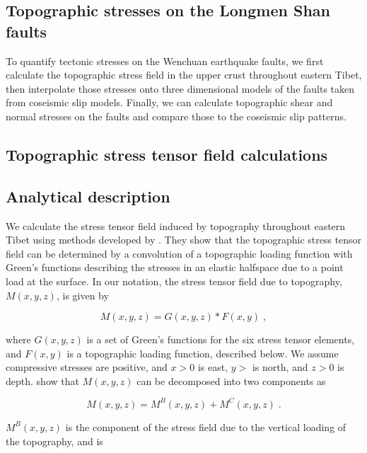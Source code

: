 \documentclass[twocolumn,jgrga]{AGUTeX}
\begin{document}
\begin{article}
\section{Topographic stresses on the Longmen Shan
faults}\label{topographic-stresses-on-the-longmen-shan-faults}

To quantify tectonic stresses on the Wenchuan earthquake faults, we
first calculate the topographic stress field in the upper crust
throughout eastern Tibet, then interpolate those stresses onto three
dimensional models of the faults taken from coseismic slip models.
Finally, we can calculate topographic shear and normal stresses on the
faults and compare those to the coseismic slip patterns.

\subsection{Topographic stress tensor field
calculations}\label{topographic-stress-tensor-field-calculations}

\subsection{Analytical description}\label{analytical-description}

We calculate the stress tensor field induced by topography throughout
eastern Tibet using methods developed by 
\citet{liuzoback1992}. They show that the topographic stress tensor
field can be determined by a convolution of a topographic loading
function with Green's functions describing the stresses in an elastic
halfspace due to a point load at the surface. In our notation, the
stress tensor field due to topography, $M(x,y,z)$, is given by

\begin{equation}
M(x, y, z) = G(x, y, z) * F(x, y) \; ,
\end{equation}

where $G(x,y,z)$ is a set of Green's functions for the six stress tensor
elements, and $F(x,y)$ is a topographic loading function, described
below. We assume compressive stresses are positive, and $x>0$ is east,
$y>$ is north, and $z>0$ is depth. \citet{liuzoback1992}
show that $M(x,y,z)$ can be decomposed into two components as

\begin{equation}
M(x,y,z) = M^B(x,y,z) + M^C(x,y,z) \; .
\end{equation}

$M^B(x,y,z)$ is the component of the stress field due to the vertical
loading of the topography, and is


\end{article}
\end{document}
